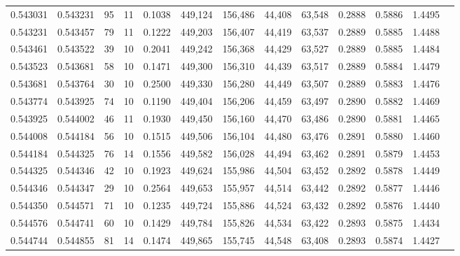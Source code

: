 \begin{tabular}{rrrrrrrrrrrrr}
0.543031 & 0.543231 &    95 &  11 &                                     0.1038 & 449,124 & 156,486 &  44,408 &  63,548 & 0.2888 & 0.5886 & 1.4495 \\
0.543231 & 0.543457 &    79 &  11 &                                     0.1222 & 449,203 & 156,407 &  44,419 &  63,537 & 0.2889 & 0.5885 & 1.4488 \\
0.543461 & 0.543522 &    39 &  10 &                                     0.2041 & 449,242 & 156,368 &  44,429 &  63,527 & 0.2889 & 0.5885 & 1.4484 \\
0.543523 & 0.543681 &    58 &  10 &                                     0.1471 & 449,300 & 156,310 &  44,439 &  63,517 & 0.2889 & 0.5884 & 1.4479 \\
0.543681 & 0.543764 &    30 &  10 &                                     0.2500 & 449,330 & 156,280 &  44,449 &  63,507 & 0.2889 & 0.5883 & 1.4476 \\
0.543774 & 0.543925 &    74 &  10 &                                     0.1190 & 449,404 & 156,206 &  44,459 &  63,497 & 0.2890 & 0.5882 & 1.4469 \\
0.543925 & 0.544002 &    46 &  11 &                                     0.1930 & 449,450 & 156,160 &  44,470 &  63,486 & 0.2890 & 0.5881 & 1.4465 \\
0.544008 & 0.544184 &    56 &  10 &                                     0.1515 & 449,506 & 156,104 &  44,480 &  63,476 & 0.2891 & 0.5880 & 1.4460 \\
0.544184 & 0.544325 &    76 &  14 &                                     0.1556 & 449,582 & 156,028 &  44,494 &  63,462 & 0.2891 & 0.5879 & 1.4453 \\
0.544325 & 0.544346 &    42 &  10 &                                     0.1923 & 449,624 & 155,986 &  44,504 &  63,452 & 0.2892 & 0.5878 & 1.4449 \\
0.544346 & 0.544347 &    29 &  10 &                                     0.2564 & 449,653 & 155,957 &  44,514 &  63,442 & 0.2892 & 0.5877 & 1.4446 \\
0.544350 & 0.544571 &    71 &  10 &                                     0.1235 & 449,724 & 155,886 &  44,524 &  63,432 & 0.2892 & 0.5876 & 1.4440 \\
0.544576 & 0.544741 &    60 &  10 &                                     0.1429 & 449,784 & 155,826 &  44,534 &  63,422 & 0.2893 & 0.5875 & 1.4434 \\
0.544744 & 0.544855 &    81 &  14 &                                     0.1474 & 449,865 & 155,745 &  44,548 &  63,408 & 0.2893 & 0.5874 & 1.4427 \\

\end{tabular}

